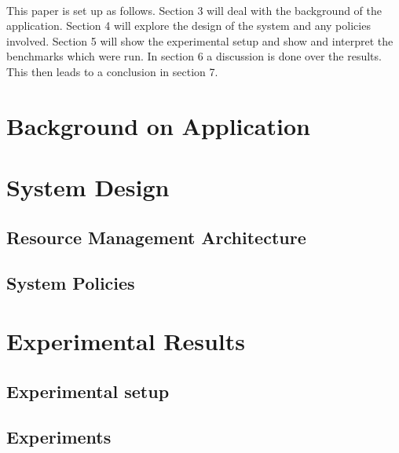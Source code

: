 \documentclass[a4paper]{IEEEtran}
\begin{document}
\\
This paper is set up as follows. Section 3 will deal with the background of the application. Section 4 will explore the design of the system and any policies involved. Section 5 will show the experimental setup and show and interpret the benchmarks which were run. In section 6 a discussion is done over the results. This then leads to a conclusion in section 7.

\section{Background on Application}

\section{System Design}

\subsection{Resource Management Architecture}






\subsection{System Policies}


\section{Experimental Results}

\subsection{Experimental setup}




\subsection{Experiments}
\end{document}
